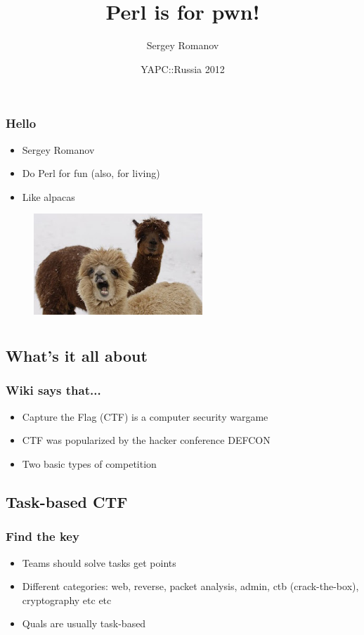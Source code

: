 \documentclass{beamer}
\title{Perl is for pwn!}
\author{Sergey Romanov}
\date{YAPC::Russia 2012}
\begin{document}
\frame{\titlepage}

\frame
{
\frametitle{Hello}
\begin{itemize}
\item Sergey Romanov
\item Do Perl for fun (also, for living)
\item Like alpacas
\end{itemize}
\begin{figure}
\includegraphics[width=2.5in,height=1.5in]{pics/alpacas.jpg}
\end{figure}
}

\section[CTF]{}

\subsection{What's it all about}
\frame
{
\frametitle{Wiki says that...}
\begin{itemize}
\item Capture the Flag (CTF) is a computer security wargame
\item CTF was popularized by the hacker conference DEFCON
\item Two basic types of competition
\end{itemize}
}

\subsection{Task-based CTF}
\frame
{
\frametitle{Find the key}
\begin{itemize}
\item Teams should solve tasks get points
\item Different categories: web, reverse, packet analysis, admin, ctb (crack-the-box), cryptography etc etc
\item Quals are usually task-based
\end{itemize}
}
\end{document}
